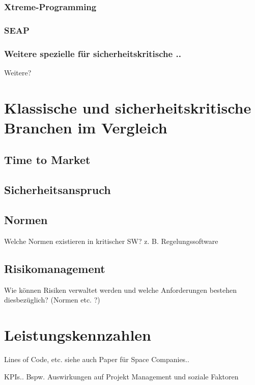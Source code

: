 \subsubsection{Xtreme-Programming}

\subsubsection{SEAP}

\subsubsection{Weitere spezielle für sicherheitskritische ..}

Weitere?

\section{Klassische und sicherheitskritische Branchen im Vergleich}

\subsection{Time to Market}

\subsection{Sicherheitsanspruch}

\subsection{Normen}

Welche Normen existieren in kritischer SW? z. B. Regelungssoftware

\subsection{Risikomanagement}

Wie können Risiken verwaltet werden und welche Anforderungen bestehen diesbezüglich? (Normen etc. ?)

\section{Leistungskennzahlen}

Lines of Code, etc.
siehe auch Paper für Space Companies..

KPIs..
Bspw. Auswirkungen auf Projekt Management und soziale Faktoren

